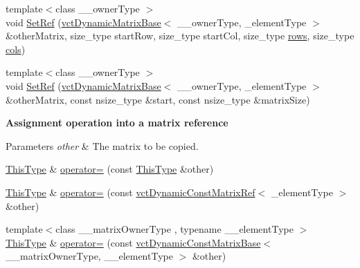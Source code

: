 {\bf }\par
\begin{DoxyCompactItemize}
\item 
{\footnotesize template$<$class \+\_\+\+\_\+owner\+Type $>$ }\\void \hyperlink{classvct_dynamic_matrix_ref_a1f6116eb9c7d353626fee6a5fc7c76b3}{Set\+Ref} (\hyperlink{classvct_dynamic_matrix_base}{vct\+Dynamic\+Matrix\+Base}$<$ \+\_\+\+\_\+owner\+Type, \+\_\+element\+Type $>$ \&other\+Matrix, size\+\_\+type start\+Row, size\+\_\+type start\+Col, size\+\_\+type \hyperlink{classvct_dynamic_const_matrix_base_a5eac13be2207ebeb8766cde379d73438}{rows}, size\+\_\+type \hyperlink{classvct_dynamic_const_matrix_base_aa6c51d41a100da49a7e7ac7edb20ecd9}{cols})
\item 
{\footnotesize template$<$class \+\_\+\+\_\+owner\+Type $>$ }\\void \hyperlink{classvct_dynamic_matrix_ref_a372cf1c8daf6229ac1d8716a3402b617}{Set\+Ref} (\hyperlink{classvct_dynamic_matrix_base}{vct\+Dynamic\+Matrix\+Base}$<$ \+\_\+\+\_\+owner\+Type, \+\_\+element\+Type $>$ \&other\+Matrix, const nsize\+\_\+type \&start, const nsize\+\_\+type \&matrix\+Size)
\end{DoxyCompactItemize}

\begin{Indent}{\bf Assignment operation into a matrix reference}\par
{\em 
\begin{DoxyParams}{Parameters}
{\em other} & The matrix to be copied. \\
\hline
\end{DoxyParams}
}\begin{DoxyCompactItemize}
\item 
\hyperlink{classvct_dynamic_matrix_ref_ac01200e3df0afe95f5d3948da84c8551}{This\+Type} \& \hyperlink{classvct_dynamic_matrix_ref_a9a5e1c7ac72ebebc31cc14b28a67e8e8}{operator=} (const \hyperlink{classvct_dynamic_matrix_ref_ac01200e3df0afe95f5d3948da84c8551}{This\+Type} \&other)
\item 
\hyperlink{classvct_dynamic_matrix_ref_ac01200e3df0afe95f5d3948da84c8551}{This\+Type} \& \hyperlink{classvct_dynamic_matrix_ref_a4746225777213ee01fd7d8bc7cdb11c3}{operator=} (const \hyperlink{classvct_dynamic_const_matrix_ref}{vct\+Dynamic\+Const\+Matrix\+Ref}$<$ \+\_\+element\+Type $>$ \&other)
\item 
{\footnotesize template$<$class \+\_\+\+\_\+matrix\+Owner\+Type , typename \+\_\+\+\_\+element\+Type $>$ }\\\hyperlink{classvct_dynamic_matrix_ref_ac01200e3df0afe95f5d3948da84c8551}{This\+Type} \& \hyperlink{classvct_dynamic_matrix_ref_a6574495be878c529a799c0f44312e462}{operator=} (const \hyperlink{classvct_dynamic_const_matrix_base}{vct\+Dynamic\+Const\+Matrix\+Base}$<$ \+\_\+\+\_\+matrix\+Owner\+Type, \+\_\+\+\_\+element\+Type $>$ \&other)
\end{DoxyCompactItemize}
\end{Indent}
